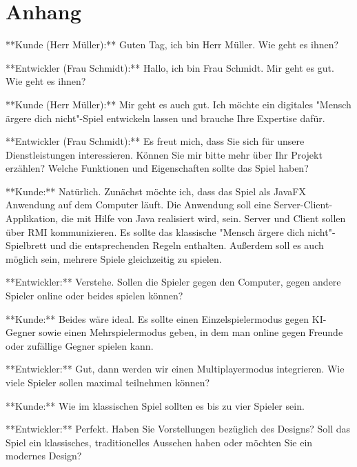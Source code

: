 
\chapter*{Anhang}

\begin{prompt}[H]
    \begin{tcolorbox}[colback=gray!20, colframe=gray!20, boxrule=0pt, sharp corners] 
        **Kunde (Herr Müller):** Guten Tag, ich bin Herr Müller. Wie geht es ihnen?

        **Entwickler (Frau Schmidt):** Hallo, ich bin Frau Schmidt. Mir geht es gut. Wie geht es ihnen?
        
        **Kunde (Herr Müller):** Mir geht es auch gut. Ich möchte ein digitales "Mensch ärgere dich nicht"-Spiel entwickeln lassen und brauche Ihre Expertise dafür.
        
        **Entwickler (Frau Schmidt):** Es freut mich, dass Sie sich für unsere Dienstleistungen interessieren. Können Sie mir bitte mehr über Ihr Projekt erzählen? Welche Funktionen und Eigenschaften sollte das Spiel haben?
        
        **Kunde:** Natürlich. Zunächst möchte ich, dass das Spiel als JavaFX Anwendung auf dem Computer läuft. Die Anwendung soll eine Server-Client-Applikation, die mit Hilfe von Java realisiert wird, sein. Server und Client sollen über RMI kommunizieren. Es sollte das klassische "Mensch ärgere dich nicht"-Spielbrett und die entsprechenden Regeln enthalten. Außerdem soll es auch möglich sein, mehrere Spiele gleichzeitig zu spielen.
        
        **Entwickler:** Verstehe. Sollen die Spieler gegen den Computer, gegen andere Spieler online oder beides spielen können?
        
        **Kunde:** Beides wäre ideal. Es sollte einen Einzelspielermodus gegen KI-Gegner sowie einen Mehrspielermodus geben, in dem man online gegen Freunde oder zufällige Gegner spielen kann.
        
        **Entwickler:** Gut, dann werden wir einen Multiplayermodus integrieren. Wie viele Spieler sollen maximal teilnehmen können?
        
        **Kunde:** Wie im klassischen Spiel sollten es bis zu vier Spieler sein.
        
        **Entwickler:** Perfekt. Haben Sie Vorstellungen bezüglich des Designs? Soll das Spiel ein klassisches, traditionelles Aussehen haben oder möchten Sie ein modernes Design?
        

\end{tcolorbox}
\end{prompt}
